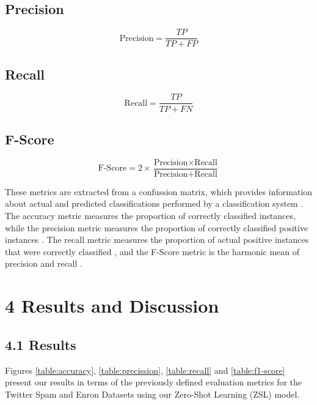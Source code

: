 \documentclass[letterpaper,twocolumn,fleqn]{article}
\begin{document}
\subsection*{Precision}

\begin{equation*}
  \text{Precision} = \frac{TP}{TP + FP}
\end{equation*}

\subsection*{Recall}

\begin{equation*}
  \text{Recall} = \frac{TP}{TP + FN}
\end{equation*}

\subsection*{F-Score}

\begin{equation*}
  \text{F-Score} = 2 \times \frac{\text{Precision} \times \text{Recall}}{\text{Precision} + \text{Recall}}
\end{equation*}

These metrics are extracted from a confussion matrix, which provides information about actual and predicted classifications performed by a classification system \cite{dengImprovedMethodConstruct2016}. The accuracy metric measures the proportion of correctly classified instances, while the precision metric measures the proportion of correctly classified positive instances \cite{dengImprovedMethodConstruct2016}. The recall metric measures the proportion of actual positive instances that were correctly classified \cite{dengImprovedMethodConstruct2016}, and the F-Score metric is the harmonic mean of precision and recall \cite{dengImprovedMethodConstruct2016}.

\section{4 Results and Discussion}
\subsection*{4.1 Results}
Figures \ref{table:accuracy}, \ref{table:precission}, \ref{table:recall} and \ref{table:f1-score} present our results in terms of the previously defined evaluation metrics for the Twitter Spam and Enron Datasets using our Zero-Shot Learning (ZSL) model.
\end{document}
